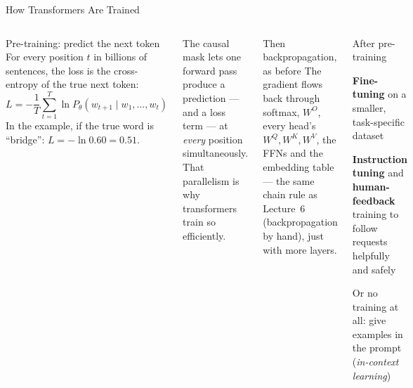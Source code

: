 \documentclass[aspectratio=169,10pt]{beamer}
\begin{document}
\begin{frame}{How Transformers Are Trained}
\begin{columns}[T]
\begin{cbox}{Pre-training: predict the next token}
For every position $t$ in billions of sentences, the loss is the cross-entropy of the true next token:
\[L=-\frac1T\sum_{t=1}^{T}\ln P_\theta(w_{t+1}\mid w_1,\dots,w_t)\]
In the example, if the true word is ``bridge'': $L=-\ln0.60=0.51$.
\end{cbox}
\begin{rbox}\scriptsize The causal mask lets one forward pass produce a prediction --- and a loss term --- at \emph{every} position simultaneously. That parallelism is why transformers train so efficiently.\end{rbox}
\begin{cbox}[ISSAnavy]{Then backpropagation, as before}
The gradient flows back through softmax, $W^O$, every head's $W^Q,W^K,W^V$, the FFNs and the embedding table --- the same chain rule as Lecture~6 (backpropagation by hand), just with more layers.
\end{cbox}
\begin{cbox}{After pre-training}
\begin{tl}
\item \textbf{Fine-tuning} on a smaller, task-specific dataset
\item \textbf{Instruction tuning} and \textbf{human-feedback} training to follow requests helpfully and safely
\item Or no training at all: give examples in the prompt (\emph{in-context learning})
\end{tl}
\end{cbox}
\end{columns}
\end{frame}
\end{document}
